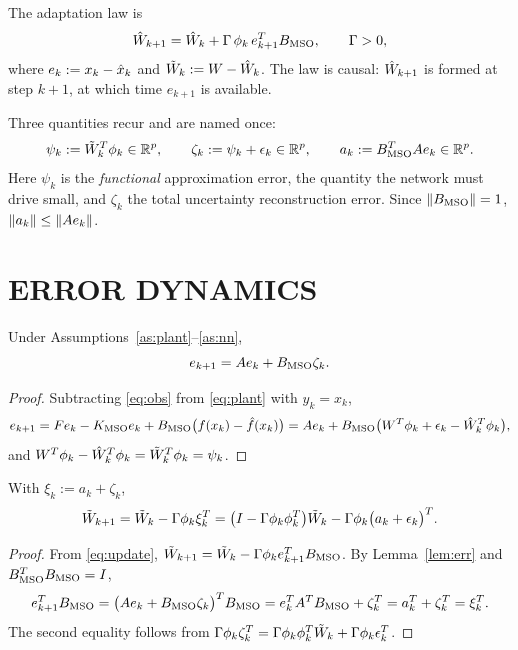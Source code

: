 The adaptation law is
\begin{equation}\label{eq:update}
\hat{W}_{k+1}=\hat{W}_k+\Gamma\,\phi_k\,e_{k+1}^TB_{\mathrm{MSO}},\qquad \Gamma>0,
\end{equation}
where $e_k:=x_k-\hat{x}_k$ and $\tilde{W}_k:=W-\hat{W}_k$. The law is causal: $\hat{W}_{k+1}$
is formed at step $k+1$, at which time $e_{k+1}$ is available.

Three quantities recur and are named once:
\begin{equation}\label{eq:shorthand}
\psi_k:=\tilde{W}_k^T\phi_k\in\mathbb{R}^p,\qquad
\zeta_k:=\psi_k+\epsilon_k\in\mathbb{R}^p,\qquad
a_k:=B_{\mathrm{MSO}}^TAe_k\in\mathbb{R}^p .
\end{equation}
Here $\psi_k$ is the \emph{functional} approximation error, the quantity the
network must drive small, and $\zeta_k$ the total uncertainty reconstruction
error. Since $\left\lVert B_{\mathrm{MSO}} \right\rVert=1$, $\left\lVert a_k \right\rVert\le\left\lVert Ae_k \right\rVert$.

\section{ERROR DYNAMICS}

\begin{lemma}\label{lem:err}
Under Assumptions~\ref{as:plant}--\ref{as:nn},
\begin{equation}\label{eq:errdyn}
e_{k+1}=Ae_k+B_{\mathrm{MSO}}\zeta_k .
\end{equation}
\end{lemma}

\begin{proof}
Subtracting \eqref{eq:obs} from \eqref{eq:plant} with $y_k=x_k$,
\[
e_{k+1}=Fe_k-K_{\mathrm{MSO}} e_k+B_{\mathrm{MSO}}\bigl(f(x_k)-\hat{f}(x_k)\bigr)
       =Ae_k+B_{\mathrm{MSO}}\bigl(W^T\phi_k+\epsilon_k-\hat{W}_k^T\phi_k\bigr),
\]
and $W^T\phi_k-\hat{W}_k^T\phi_k=\tilde{W}_k^T\phi_k=\psi_k$.
\end{proof}

\begin{lemma}\label{lem:werr}
With $\xi_k:=a_k+\zeta_k$,
\begin{equation}\label{eq:wdyn}
\tilde{W}_{k+1}=\tilde{W}_k-\Gamma\phi_k\xi_k^T
=\bigl(I-\Gamma\phi_k\phi_k^T\bigr)\tilde{W}_k-\Gamma\phi_k\bigl(a_k+\epsilon_k\bigr)^T .
\end{equation}
\end{lemma}

\begin{proof}
From \eqref{eq:update}, $\tilde{W}_{k+1}=\tilde{W}_k-\Gamma\phi_k e_{k+1}^TB_{\mathrm{MSO}}$. By
Lemma~\ref{lem:err} and $B_{\mathrm{MSO}}^TB_{\mathrm{MSO}}=I$,
\[
e_{k+1}^TB_{\mathrm{MSO}}=\bigl(Ae_k+B_{\mathrm{MSO}}\zeta_k\bigr)^TB_{\mathrm{MSO}}
=e_k^TA^TB_{\mathrm{MSO}}+\zeta_k^T=a_k^T+\zeta_k^T=\xi_k^T .
\]
The second equality follows from
$\Gamma\phi_k\zeta_k^T=\Gamma\phi_k\phi_k^T\tilde{W}_k+\Gamma\phi_k\epsilon_k^T$.
\end{proof}


